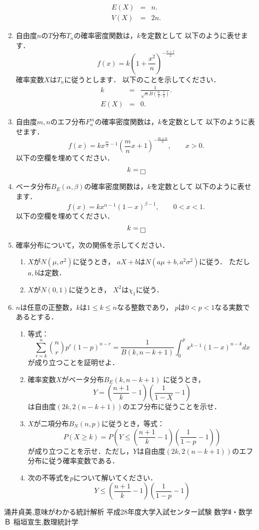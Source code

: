\documentclass[12pt]{ltjsarticle}
\begin{document}
\begin{enumerate}
\begin{eqnarray*}
E\left(X\right)&=&n. \\
V\left(X\right)&=&2n.
\end{eqnarray*}
\item
自由度$n$の$T$分布$T_n$の確率密度関数は，$k$を定数として
以下のように表せます．
\[
f\left(x\right)=k\left(1+\frac{x^2}{n}\right)^{-\frac{n+1}{2}}
\]
確率変数$X$は$T_n$に従うとします．
以下のことを示してください．
\begin{eqnarray*}
k&=&\frac{1}{\sqrt{n}B\left(\frac{n}{2},\frac{1}{2}\right)}. \\
E\left(X\right)&=&0.
\end{eqnarray*}
\item
自由度$m,n$のエフ分布$F_n^m$の確率密度関数は，$k$を定数として
以下のように表せます．
\[
f\left(x\right)=kx^{\frac{m}{2}-1}\left(\frac{m}{n}x+1\right)^{-\frac{m+n}{2}}
,\qquad
x>0.
\]
以下の空欄を埋めてください．
\[
k=\fbox{}
\]
\item
ベータ分布$B_E\left(\alpha,\beta\right)$の確率密度関数は，$k$を定数として
以下のように表せます．
\[
f\left(x\right)=kx^{\alpha-1}\left(1-x\right)^{\beta-1},\qquad
0<x<1.
\]
以下の空欄を埋めてください．
\[
k=\fbox{}
\]
\item
確率分布について，次の関係を示してください．
\begin{enumerate}
\item
$X$が$N\left(\mu,\sigma^2\right)$に従うとき，
$aX+b$は$N\left(a\mu+b,a^2\sigma^2\right)$に従う．
ただし$a,b$は定数．
\item
$X$が$N\left(0,1\right)$に従うとき，
$X^2$は$\chi_1$に従う．
\end{enumerate}
\item
$n$は任意の正整数，$k$は$1\le k\le n$なる整数であり，
$p$は$0<p<1$なる実数であるとする．
\begin{enumerate}
\item
等式：
\[
\sum_{r=k}^{n}\binom{n}{r}p^r\left(1-p\right)^{n-r}=
\frac{1}{B\left(k,n-k+1\right)}\int_0^p x^{k-1}\left(1-x\right)^{n-k}dx
\]
が成り立つことを証明せよ．
\cite[p.47]{inagaki}
\item
確率変数$X$がベータ分布$B_E\left(k,n-k+1\right)$
に従うとき，$$ Y=\left(\frac{n+1}{k}-1\right)\left(\frac{1}{1-X}-1\right)$$
は自由度$\left(2k,
2\left(n-k+1\right)\right)$のエフ分布に従うことを示せ．
\cite[p.106]{inagaki}
\item
$X$が二項分布$B_N\left(n,p\right)$に従うとき，等式：
\[
P\left(X \ge k\right)=
P\left(Y\le \left(\frac{n+1}{k}-1\right)\left(\frac{1}{1-p}-1\right)\right)
\]
が成り立つことを示せ．ただし，$Y$は自由度$\left(2k,
2\left(n-k+1\right)\right)$のエフ分布に従う確率変数である．
\cite[p.106]{inagaki}
\item
次の不等式を$p$について解いてください．
\[
Y\le \left(\frac{n+1}{k}-1\right)\left(\frac{1}{1-p}-1\right)
\]
\end{enumerate}
\end{enumerate}
\begin{thebibliography}{9}
 涌井貞美,意味がわかる統計解析
 平成28年度大学入試センター試験 数学Ⅱ・数学Ｂ
 稲垣宣生,数理統計学
\end{thebibliography}
\end{document}

